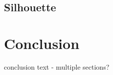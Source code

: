\documentclass{l4proj}
\begin{document}
\section{Silhouette}


\chapter{Conclusion}
\label{conclusion}

conclusion text - multiple sections?




\end{document}
